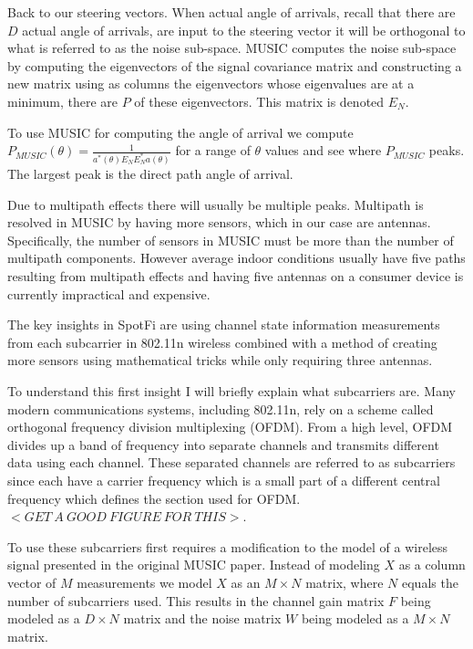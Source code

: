 \documentclass[12pt]{report}
\begin{document}
Back to our steering vectors. When actual angle of arrivals, recall that there are $D$ actual angle of arrivals, are input to the steering vector it will be orthogonal to what is referred to as the noise sub-space. MUSIC computes the noise sub-space by computing the eigenvectors of the signal covariance matrix and constructing a new matrix using as columns the eigenvectors whose eigenvalues are at a minimum, there are $P$ of these eigenvectors. This matrix is denoted $E_{N}$. 

To use MUSIC for computing the angle of arrival we compute $P_{MUSIC}(\theta) = \frac{1}{a^{*}(\theta) E_{N} E_{N}^{*} a(\theta)}$ for a range of $\theta$ values and see where $P_{MUSIC}$ peaks. The largest peak is the direct path angle of arrival. \par

Due to multipath effects there will usually be multiple peaks. Multipath is resolved in MUSIC by having more sensors, which in our case are antennas. Specifically, the number of sensors in MUSIC must be more than the number of multipath components. However average indoor conditions usually have five paths resulting from multipath effects and having five antennas on a consumer device is currently impractical and expensive. \par

The key insights in SpotFi are using channel state information measurements from each subcarrier in 802.11n wireless combined with a method of creating more sensors using mathematical tricks while only requiring three antennas. \par

To understand this first insight I will briefly explain what subcarriers are. Many modern communications systems, including 802.11n, rely on a scheme called orthogonal frequency division multiplexing (OFDM). From a high level, OFDM divides up a band of frequency into separate channels and transmits different data using each channel. These separated channels are referred to as subcarriers since each have a carrier frequency which is a small part of a different central frequency which defines the section used for OFDM.  $<GET \: A \: GOOD \: FIGURE \: FOR \: THIS>$. \par

To use these subcarriers first requires a modification to the model of a wireless signal presented in the original MUSIC paper. Instead of modeling $X$ as a column vector of $M$ measurements we model $X$ as an $M \times N$ matrix, where $N$ equals the number of subcarriers used. This results in the channel gain matrix $F$ being modeled as a $D \times N$ matrix and the noise matrix $W$ being modeled as a $M \times N$ matrix. \par
\end{document}
